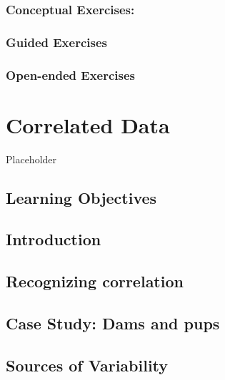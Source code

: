 \documentclass[
]{krantz}
\begin{document}
\hypertarget{conceptual-exercises-3}{%
\subsection{Conceptual Exercises:}\label{conceptual-exercises-3}}

\hypertarget{guided-exercises-3}{%
\subsection{Guided Exercises}\label{guided-exercises-3}}

\hypertarget{open-ended-exercises-2}{%
\subsection{Open-ended Exercises}\label{open-ended-exercises-2}}

\hypertarget{ch-corrdata}{%
\chapter{Correlated Data}\label{ch-corrdata}}

Placeholder

\hypertarget{learning-objectives-6}{%
\section{Learning Objectives}\label{learning-objectives-6}}

\hypertarget{introduction-1}{%
\section{Introduction}\label{introduction-1}}

\hypertarget{recognizing-correlation}{%
\section{Recognizing correlation}\label{recognizing-correlation}}

\hypertarget{case-study-dams-and-pups}{%
\section{Case Study: Dams and pups}\label{case-study-dams-and-pups}}

\hypertarget{sources-of-variability}{%
\section{Sources of Variability}\label{sources-of-variability}}
\end{document}
